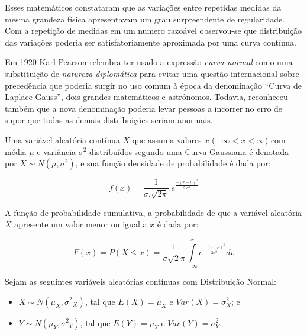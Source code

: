 \documentclass[
]{book}
\providecommand{\tightlist}{%
  \setlength{\itemsep}{0pt}\setlength{\parskip}{0pt}}
\begin{document}
\hfill\break

Esses matemáticos constataram que as variações entre repetidas medidas da mesma grandeza física apresentavam um grau surpreendente de regularidade. Com a repetição de medidas em um numero razoável observou-se que distribuição das variações poderia ser satisfatoriamente aproximada por uma curva contínua.

\hfill\break

Em 1920 Karl Pearson relembra ter usado a expressão \emph{curva normal} como uma substituição de \emph{natureza diplomática} para evitar uma questão internacional sobre precedência que poderia surgir no uso comum à época da denominação ``Curva de Laplace-Gauss'', dois grandes matemáticos e astrônomos. Todavia, reconheceu também que a nova denominação poderia levar pessoas a incorrer no erro de supor que todas as demais distribuições seriam anormais.

\hfill\break

Uma variável aleatória contínua \(X\) que assuma valores \(x\) (\(-\infty < x < \infty\)) com média \(\mu\) e variância \(\sigma^{2}\) distribuídos segundo uma Curva Gaussiana é denotada por \(X \sim N(\mu, \sigma^{2})\), e sua função densidade de probabilidade é dada por:

\hfill\break

\[
f(x)=\frac{1}{ {\sigma . \sqrt {2\pi }}}. e^\frac{{-(x-\mu)^{2}}}{2.\sigma^{2}}
\]

\hfill\break

A função de probabilidade cumulativa, a probabilidade de que a variável aleatória \(X\) apresente um valor menor ou igual a \(x\) é dada por:

\hfill\break

\[
F(x) = P(X\le x) =  \frac{1}{\sigma \sqrt{2}\pi } \underset{-\infty }{\overset{x}{\int }} {e^ \frac{-(v - \mu)^{2}}{2\sigma^{2}}}dv
\]

\hfill\break

Sejam as seguintes variáveis aleatórias contínuas com Distribuição Normal:

\hfill\break

\begin{itemize}
\tightlist
\item
  \(X \sim N(\mu_{X}, {\sigma^{2}}_{X})\), tal que \(E(X)=\mu_{X}\) e \(Var(X)= \sigma^{2}_{X}\); e\\
\item
  \(Y \sim N(\mu_{Y}, {\sigma^{2}}_{Y})\), tal que \(E(Y)=\mu_{Y}\) e \(Var(Y)= \sigma^{2}_{Y}\).
\end{itemize}
\end{document}
